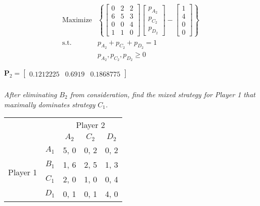 \documentclass[12pt]{amsart}
\begin{document}
	\begin{align*} 
		\text{Maximize} &\left\{
		\begin{bmatrix}
			0 & 2 & 2 \\
			6 & 5 & 3 \\
			0 & 0 & 4 \\
			1 & 1 & 0 
		\end{bmatrix} 
		\begin{bmatrix}
			p_{A_2} \\ p_{C_2} \\ p_{D_2}
		\end{bmatrix} -
		\begin{bmatrix}
			1 \\ 4 \\ 0 \\ 0
		\end{bmatrix}
		\right\} \\
		\text{s.t. }\qquad 
		&p_{A_2} + p_{C_2} + p_{D_2} = 1 \\
		&p_{A_2},p_{C_2},p_{D_2} \geq 0 
	\end{align*}

	\(\mathbf P_2 = \begin{bmatrix}0.1212225 & 0.6919 & 0.1868775\end{bmatrix}\)

	\subsubsection{}
	\textit{After eliminating $B_2$ from consideration, find the mixed strategy for Player 1 that
	maximally dominates strategy $C_1$.}
	
	\begin{center}
		\def\arraystretch{1.25}%
		\begin{tabular}{ccccc}
			&                            & \multicolumn{3}{c}{Player 2}                                                         \\
			& \multicolumn{1}{c|}{}      & \multicolumn{1}{c|}{$A_2$} & \multicolumn{1}{c|}{$C_2$} & \multicolumn{1}{c|}{$D_2$} \\ \cline{2-5} 
			\multirow{4}{*}{Player 1} & \multicolumn{1}{c|}{$A_1$} & \multicolumn{1}{c|}{5, 0}  & \multicolumn{1}{c|}{0, 2}  & \multicolumn{1}{c|}{0, 2}  \\ \cline{2-5} 
			& \multicolumn{1}{c|}{$B_1$} & \multicolumn{1}{c|}{1, 6}  & \multicolumn{1}{c|}{2, 5}  & \multicolumn{1}{c|}{1, 3}  \\ \cline{2-5} 
			& \multicolumn{1}{c|}{$C_1$} & \multicolumn{1}{c|}{2, 0}  & \multicolumn{1}{c|}{1, 0}  & \multicolumn{1}{c|}{0, 4}  \\ \cline{2-5} 
			& \multicolumn{1}{c|}{$D_1$} & \multicolumn{1}{c|}{0, 1}  & \multicolumn{1}{c|}{0, 1}  & \multicolumn{1}{c|}{4, 0}  \\ \cline{2-5} 
		\end{tabular}
	\end{center}
\end{document}
